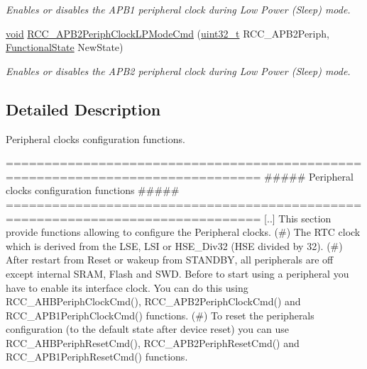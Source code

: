 \begin{DoxyCompactItemize}
\begin{DoxyCompactList}\small\item\em Enables or disables the A\-P\-B1 peripheral clock during Low Power (Sleep) mode. \end{DoxyCompactList}\item 
\hyperlink{group___n_a_m_e_ga18028b8badbf1ea7e704ccac3c488e82}{void} \hyperlink{group___r_c_c___group3_ga30365b9e0b4c5d7e98c2675c862ddd7e}{R\-C\-C\-\_\-\-A\-P\-B2\-Periph\-Clock\-L\-P\-Mode\-Cmd} (\hyperlink{stdint_8h_a435d1572bf3f880d55459d9805097f62}{uint32\-\_\-t} R\-C\-C\-\_\-\-A\-P\-B2\-Periph, \hyperlink{group___exported__types_gac9a7e9a35d2513ec15c3b537aaa4fba1}{Functional\-State} New\-State)
\begin{DoxyCompactList}\small\item\em Enables or disables the A\-P\-B2 peripheral clock during Low Power (Sleep) mode. \end{DoxyCompactList}\end{DoxyCompactItemize}


\subsection{Detailed Description}
Peripheral clocks configuration functions. \begin{DoxyVerb} ===============================================================================
            ##### Peripheral clocks configuration functions #####
 ===============================================================================  
    [..] This section provide functions allowing to configure the Peripheral clocks. 
         (#) The RTC clock which is derived from the LSE, LSI or  HSE_Div32 
             (HSE divided by 32).
         (#) After restart from Reset or wakeup from STANDBY, all peripherals are 
             off except internal SRAM, Flash and SWD. Before to start using 
             a peripheral you have to enable its interface clock. You can do this 
             using RCC_AHBPeriphClockCmd(), RCC_APB2PeriphClockCmd() 
             and RCC_APB1PeriphClockCmd() functions.
         (#) To reset the peripherals configuration (to the default state after 
             device reset) you can use RCC_AHBPeriphResetCmd(), RCC_APB2PeriphResetCmd() 
             and RCC_APB1PeriphResetCmd() functions.
\end{DoxyVerb}


